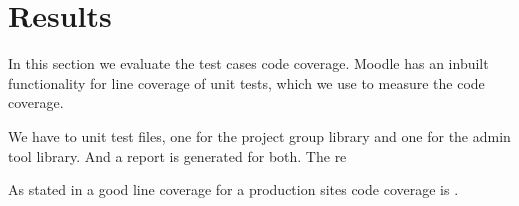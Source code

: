 \section{Results}
\label{sec:results}

In this section we evaluate the test cases code coverage. 
Moodle has an inbuilt functionality for line coverage of unit tests, which we use to measure the code coverage.

We have to unit test files, one for the project group library and one for the admin tool library. 
And a report is generated for both. The re


As stated in  a good line coverage for a production sites code coverage is \idealCC{}.
